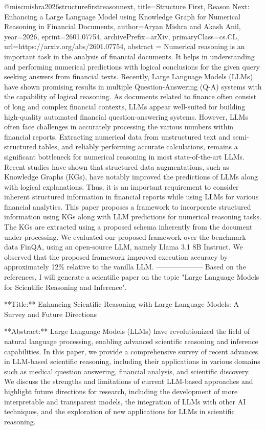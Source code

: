 {}@misc{mishra2026structurefirstreasonnext,
      title={Structure First, Reason Next: Enhancing a Large Language Model using Knowledge Graph for Numerical Reasoning in Financial Documents}, 
      author={Aryan Mishra and Akash Anil},
      year={2026},
      eprint={2601.07754},
      archivePrefix={arXiv},
      primaryClass={cs.CL},
      url={https://arxiv.org/abs/2601.07754},
      abstract = {Numerical reasoning is an important task in the analysis of financial documents. It helps in understanding and performing numerical predictions with logical conclusions for the given query seeking answers from financial texts. Recently, Large Language Models (LLMs) have shown promising results in multiple Question-Answering (Q-A) systems with the capability of logical reasoning. As documents related to finance often consist of long and complex financial contexts, LLMs appear well-suited for building high-quality automated financial question-answering systems. However, LLMs often face challenges in accurately processing the various numbers within financial reports. Extracting numerical data from unstructured text and semi-structured tables, and reliably performing accurate calculations, remains a significant bottleneck for numerical reasoning in most state-of-the-art LLMs. Recent studies have shown that structured data augmentations, such as Knowledge Graphs (KGs), have notably improved the predictions of LLMs along with logical explanations. Thus, it is an important requirement to consider inherent structured information in financial reports while using LLMs for various financial analytics. This paper proposes a framework to incorporate structured information using KGs along with LLM predictions for numerical reasoning tasks. The KGs are extracted using a proposed schema inherently from the document under processing. We evaluated our proposed framework over the benchmark data FinQA, using an open-source LLM, namely Llama 3.1 8B Instruct. We observed that the proposed framework improved execution accuracy by approximately 12\% relative to the vanilla LLM.}
}
        --------------------
         Based on the references, I will generate a scientific paper on the topic "Large Language Models for Scientific Reasoning and Inference".

**Title:** Enhancing Scientific Reasoning with Large Language Models: A Survey and Future Directions

**Abstract:** Large Language Models (LLMs) have revolutionized the field of natural language processing, enabling advanced scientific reasoning and inference capabilities. In this paper, we provide a comprehensive survey of recent advances in LLM-based scientific reasoning, including their applications in various domains such as medical question answering, financial analysis, and scientific discovery. We discuss the strengths and limitations of current LLM-based approaches and highlight future directions for research, including the development of more interpretable and transparent models, the integration of LLMs with other AI techniques, and the exploration of new applications for LLMs in scientific reasoning.

